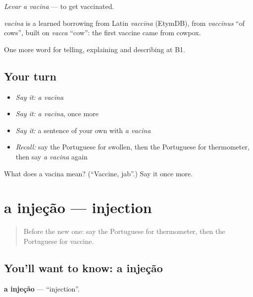 \emph{Levar a vacina} — to get vaccinated.

\begin{cousinweb}
\emph{vacina} is a learned borrowing from Latin \emph{vaccīna} (EtymDB), from \emph{vaccīnus} \textquotedblleft{}of cows\textquotedblright{}, built on \emph{vacca} \textquotedblleft{}cow\textquotedblright{}: the first vaccine came from cowpox.
\end{cousinweb}

\begin{grammarlens}[title={What you've built}]
One more word for telling, explaining and describing at B1.
\end{grammarlens}

\subsection*{Your turn}
\begin{itemize}
\raggedright
  \item \emph{Say it:} \emph{a vacina}
  \item \emph{Say it:} \emph{a vacina}, once more
  \item \emph{Say it:} a sentence of your own with \emph{a vacina}
  \item \emph{Recall:} say the Portuguese for swollen, then the Portuguese for thermometer, then say \emph{a vacina} again
\end{itemize}

\begin{tcolorbox}[breakable,colback=teal!4,colframe=teal!35!black,title={Before you move on}]
What does a vacina mean? (\textquotedblleft{}Vaccine, jab\textquotedblright{}.) Say it once more.
\end{tcolorbox}
\section[a injeção]{a injeção — injection}

\label{lesson:PT-C486-injecao}



\begin{quote}
Before the new one: say the Portuguese for thermometer, then the Portuguese for vaccine.
\end{quote}

\subsection*{You'll want to know: a injeção}
\textbf{a injeção} — \textquotedblleft{}injection\textquotedblright{}.


